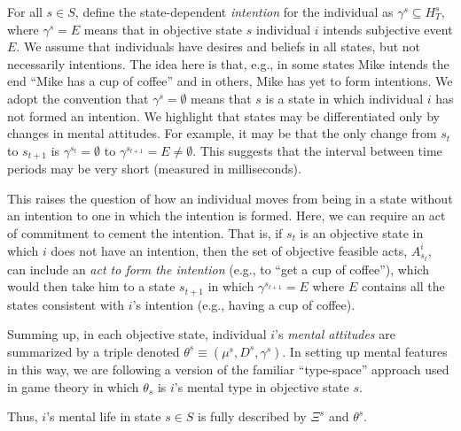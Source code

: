 \documentclass[
11pt,
titlepage,
reqno,
]{article}%
\theoremstyle{definition}
\begin{document}
For all $s\in S$, define the state-dependent \textit{intention} for the individual as $\gamma^s\subseteq H^s_T$, where $\gamma^s=E$ means that in objective state $s$ individual $i$ intends subjective event $E$. 
We assume that individuals have desires and beliefs in all states, but not necessarily intentions. 
The idea here is that, e.g., in some states Mike intends the end ``Mike has a cup of coffee'' and in others, Mike has yet to form intentions.
We adopt the convention that $\gamma^s=\emptyset$ means that $s$ is a state in which individual $i$ has not formed an intention. 
We highlight that states may be differentiated only by changes in mental attitudes. 
For example, it may be that the only change from $s_t$ to $s_{t+1}$ is $\gamma^{s_t}=\emptyset$ to $\gamma^{s_{t+1}}=E\ne\emptyset$.
This suggests that the interval between time periods may be very short (measured in milliseconds).
	
This raises the question of how an individual moves from being in a state without an intention to one in which the intention is formed. 
Here, we can require an act of commitment to cement the intention. 
That is, if $s_t$ is an objective state in which $i$ does not have an intention, then the set of objective feasible acts, $A^i_{s_t}$, can include an \textit{act to form the intention} (e.g., to ``get a cup of coffee''), which would then take him to a state $s_{t+1}$ in which $\gamma^{s_{t+1}}=E$ where $E$ contains all the states consistent with $i$'s intention (e.g., having a cup of coffee).
	
Summing up, in each objective state, individual $i$'s \textit{mental attitudes} are summarized by a triple denoted $\theta^s\equiv(\mu^s,D^s,\gamma^s)$.
In setting up mental features in this way, we are following a version of the familiar ``type-space'' approach used in game theory \citep[See][]{Harsanyi1967, Mertens1985a} in which $\theta_s$ is $i$'s mental type in objective state $s$. 

Thus, $i$'s mental life  in state $s\in S$ is fully described by $\Xi^s$ and $\theta^s$.
	
	
	




\pagebreak
\end{document}
